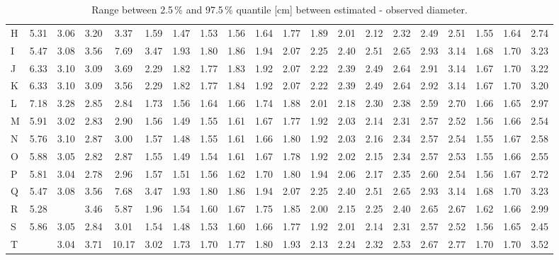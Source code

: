 \documentclass[twocolumn]{scrartcl}
\begin{document}
\begin{table*}[htbp]
\begin{adjustbox}{width=1.95\columnwidth}
\begin{tabular*}{\linewidth}{l |@{~~~} *{19}{S[detect-weight,mode=text,table-format=1.2]}}
H & 5.31 & 3.06 & 3.20 & 3.37 & 1.59 & 1.47 & 1.53 & 1.56 & 1.64 & 1.77 & 1.89 & 2.01 & 2.12 & 2.32 & 2.49 & 2.51 & 1.55 & 1.64 & 2.74 \\
I & 5.47 & 3.08 & 3.56 & 7.69 & 3.47 & 1.93 & 1.80 & 1.86 & 1.94 & 2.07 & 2.25 & 2.40 & 2.51 & 2.65 & 2.93 & 3.14 & 1.68 & 1.70 & 3.23 \\
J & 6.33 & 3.10 & 3.09 & 3.69 & 2.29 & 1.82 & 1.77 & 1.83 & 1.92 & 2.07 & 2.22 & 2.39 & 2.49 & 2.64 & 2.91 & 3.14 & 1.67 & 1.70 & 3.22 \\[.35em]
K & 6.33 & 3.10 & 3.09 & 3.56 & 2.29 & 1.82 & 1.77 & 1.84 & 1.92 & 2.07 & 2.22 & 2.39 & 2.49 & 2.64 & 2.92 & 3.14 & 1.67 & 1.70 & 3.20 \\
L & 7.18 & 3.28 & 2.85 & 2.84 & 1.73 & 1.56 & 1.64 & 1.66 & 1.74 & 1.88 & 2.01 & 2.18 & 2.30 & 2.38 & 2.59 & 2.70 & 1.66 & 1.65 & 2.97 \\
M & 5.91 & 3.02 & 2.83 & 2.90 & 1.56 & 1.49 & 1.55 & 1.61 & 1.67 & 1.77 & 1.92 & 2.03 & 2.14 & 2.31 & 2.57 & 2.52 & 1.56 & 1.66 & 2.54 \\
N & 5.76 & 3.10 & 2.87 & 3.00 & 1.57 & 1.48 & 1.55 & 1.61 & 1.66 & 1.80 & 1.92 & 2.03 & 2.16 & 2.34 & 2.57 & 2.54 & 1.55 & 1.67 & 2.58 \\
O & 5.88 & 3.05 & 2.82 & 2.87 & 1.55 & 1.49 & 1.54 & 1.61 & 1.67 & 1.78 & 1.92 & 2.02 & 2.15 & 2.34 & 2.57 & 2.53 & 1.55 & 1.66 & 2.55 \\[.35em]
P & 5.81 & 3.04 & 2.78 & 2.96 & 1.57 & 1.51 & 1.56 & 1.62 & 1.70 & 1.80 & 1.94 & 2.06 & 2.17 & 2.35 & 2.60 & 2.54 & 1.56 & 1.67 & 2.72 \\
Q & 5.47 & 3.08 & 3.56 & 7.68 & 3.47 & 1.93 & 1.80 & 1.86 & 1.94 & 2.07 & 2.25 & 2.40 & 2.51 & 2.65 & 2.93 & 3.14 & 1.68 & 1.70 & 3.23 \\
R & 5.28 &  & 3.46 & 5.87 & 1.96 & 1.54 & 1.60 & 1.67 & 1.75 & 1.85 & 2.00 & 2.15 & 2.25 & 2.40 & 2.65 & 2.67 & 1.62 & 1.66 & 2.99 \\
S & 5.86 & 3.05 & 2.84 & 3.01 & 1.54 & 1.48 & 1.53 & 1.60 & 1.66 & 1.77 & 1.92 & 2.01 & 2.14 & 2.31 & 2.57 & 2.52 & 1.56 & 1.65 & 2.45 \\
T &  & 3.04 & 3.71 & 10.17 & 3.02 & 1.73 & 1.70 & 1.77 & 1.80 & 1.93 & 2.13 & 2.24 & 2.32 & 2.53 & 2.67 & 2.77 & 1.70 & 1.70 & 3.52
\end{tabular*}
\end{adjustbox}
\caption{Range between 2.5\,\% and 97.5\,\% quantile [cm] between estimated - observed diameter.}
\label{tab:quntRangeInterpol}
\end{table*}
\end{document}
